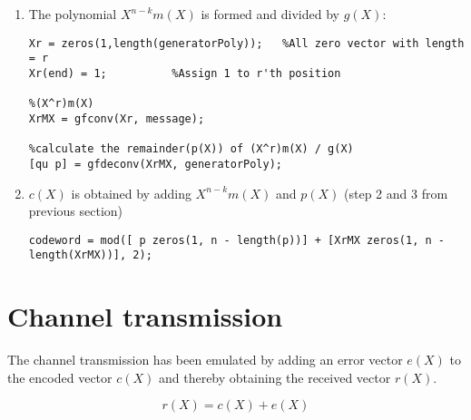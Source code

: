 \documentclass[Main]{subfiles}
\begin{document}
\begin{enumerate}
\item The polynomial $X^{n-k}m(X)$ is formed and divided by $g(X)$:
\begin{lstlisting}[label={lst:obtainP},captionpos=b, caption=Obtaining $p(X)$ as the remainder of $X^rm(X) / g(X)$.] 
%creating X^(n-k) = X^r
Xr = zeros(1,length(generatorPoly));   %All zero vector with length = r
Xr(end) = 1;          %Assign 1 to r'th position

%(X^r)m(X)
XrMX = gfconv(Xr, message);

%calculate the remainder(p(X)) of (X^r)m(X) / g(X) 
[qu p] = gfdeconv(XrMX, generatorPoly);
\end{lstlisting}

\item $c(X)$ is obtained by adding  $X^{n-k}m(X)$ and $p(X)$ (step 2 and 3 from previous section)

\begin{lstlisting}[label={lst:obtainC},captionpos=b, caption=Obtaining $c(X)$ by adding $X^{n-k}m(X)$ and $p(X)$.]
codeword = mod([ p zeros(1, n - length(p))] + [XrMX zeros(1, n - length(XrMX))], 2);
\end{lstlisting}
\end{enumerate}



\section{Channel transmission}
The channel transmission has been emulated by adding an error vector $e(X)$ to the encoded vector $c(X)$ and thereby obtaining the received vector $r(X)$. 

\begin{equation}
r(X) = c(X) + e(X)
\end{equation} 
\end{document}
